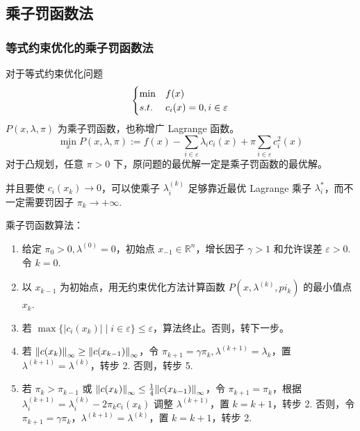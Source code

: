 \subsection{乘子罚函数法}
\subsubsection{等式约束优化的乘子罚函数法}
\begin{note}
    对于等式约束优化问题\[\begin{cases}
        \min &f(x)\\
        s.t. &c_i(x) = 0, i \in \varepsilon    
    \end{cases}\]
    $P(x, \lambda, \pi)$ 为乘子罚函数，也称增广 Lagrange 函数。
    \[\min_xP(x, \lambda, \pi) := f(x) - \sum_{i \in \varepsilon}\lambda_ic_i(x) + \pi\sum_{i \in \varepsilon}c_i^2(x)\]
    对于凸规划，任意 $\pi > 0$ 下，原问题的最优解一定是乘子罚函数的最优解。

    并且要使 $c_i(x_k) \to 0$，可以使乘子 $\lambda_i^{(k)}$ 足够靠近最优 Lagrange 乘子 $\lambda_i^*$，而不一定需要罚因子 $\pi_k \to +\infty$.
\end{note}

\begin{note}
    乘子罚函数算法：\begin{enumerate}
        \item 给定 $\pi_0 > 0, \lambda^{(0)} = 0$，初始点 $x_{-1} \in \mathbb{R}^n$，增长因子 $\gamma > 1$ 和允许误差 $\varepsilon > 0$. 令 $k = 0$.
        \item 以 $x_{k - 1}$ 为初始点，用无约束优化方法计算函数 $P(x, \lambda^{(k)}, pi_k)$ 的最小值点 $x_k$.
        \item 若 $\max\{|c_i(x_k)| \mid i \in \varepsilon\} \le \varepsilon$，算法终止。否则，转下一步。
        \item 若 $\norm{c(x_k)}_\infty \ge \norm{c(x_{k - 1})}_\infty$，令 $\pi_{k + 1} = \gamma \pi_k, \lambda^{(k + 1)} = \lambda_k$，置 $\lambda^{(k + 1)} = \lambda^{(k)}$，转步 2. 否则，转步 5.
        \item 若 $\pi_k > \pi_{k - 1}$ 或 $\norm{c(x_k)}_\infty \le \frac{1}{4}\norm{c(x_{k - 1})}_\infty$，令 $\pi_{k + 1} = \pi_k$，根据 $\lambda_i^{(k + 1)} = \lambda_i^{(k)} - 2\pi_kc_i(x_k)$ 调整 $\lambda^{(k + 1)}$，置 $k = k + 1$，转步 2. 否则，令 $\pi_{k + 1} = \gamma \pi_k$，$\lambda^{(k + 1)} = \lambda^{(k)}$，置 $k = k + 1$，转步 2.
    \end{enumerate}
\end{note}





